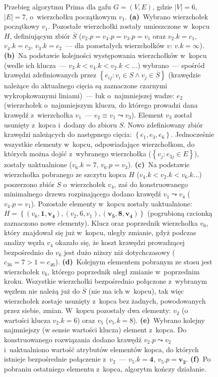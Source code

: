 \begin{figure}[!htbp]
\begin{subfigure}[b]{0.29\textwidth}
		\caption{}
		\label{fig:prime:f}
	\end{subfigure}
	\caption{
		Przebieg algorytmu Prima dla gafu $G = \left( V, E \right)$, gdzie $\left| V \right| = 6$, $\left| E \right| = 7$, o~wierzchołku początkowym $v_{1}$.
		\textbf{(a)}~Wybrano wierzchołek początkowy $v_{1}$.
		Pozostałe wierzchołki zostały umieszczone w~kopcu $H$, definiującym zbiór $\overline{S}$ ($v_{2}.p = v_{4}.p = v_{3}.p = v_{1}$ oraz $v_{2}.k = c_{1}$, $v_{4}.k = c_{3}$, $v_{3}.k = c_{2}$~--- dla pozostałych wierzchołków $v$: $v.k = \infty$).
		\textbf{(b)}~Na podstawie kolejności występowania wierzchołków w~kopcu (wedle ich klucza~--- $v_{3}.k < v_{4}.k < v_{2}.k < \dots$) wybrano~--- spośród krawędzi zdefiniowanych przez $\left\{ e_{ij} : v_{i} \in S \wedge v_{j} \in \overline{S} \right\}$ (krawędzie należące do aktualnego cięcia są zaznaczone czarnymi wykropkowanymi liniami)~--- łuk o~najmniejszej wadze: $e_{2}$ (wierzchołek o~najmniejszym kluczu, do którego prowadzi dana krawędź z~wierzchołka $v_{1}$~--- $e_{2} \equiv v_{1} \leadsto v_{3}$).
		Element $v_{3}$ został usunięty z~kopca i~dodany do zbioru $S$.
		Nowo zdefiniowany zbiór krawędzi należących do następnego cięcia: $\left\{ e_{1}, e_{3}, e_{6} \right\}$.
		Jednocześnie wszystkie elementy w~kopcu, odpowiadające wierzchołkom, do których można dojść z~wybranego wierzchołka ($\left\{ v_{j} : e_{3j} \in E \right\}$), zostały uaktualnione ($v_{6}.k = 7$, $v_{6}.p = v_{3}$).
		\textbf{(c)}~Na podstawie wierzchołka pobranego ze szczytu kopca $H$ ($v_{4}.k < v_{2}.k < v_{6}.k \dots$) poszerzono zbiór $S$ o~wierzchołek $v_{4}$, zaś do konstruowanego minimalnego drzewa rozpinającego dodano krawędź $v_{1} \leadsto v_{4}$ ($v_{4}.p = v_{1}$).
		Pozostałe elementy w~kopcu zostały uaktualnione: $H = \left\{ \left( v_{6}, \textbf{1}, \textbf{v}_{\textbf{4}} \right), \left( v_{2}, 6, v_{1} \right), \left( \textbf{v}_{\textbf{5}}, \textbf{8}, \textbf{v}_{\textbf{4}} \right) \right\}$ (pogrubioną czcionką zaznaczono nowe elementy).
		Klucz oraz poprzednik wierzchołka $v_{6}$, który znajdował się już w~kopcu, uległy zmianie, gdyż podczas analizy węzła $v_{4}$ okazało się, że koszt krawędzi prowadzącej bezpośrednio do $v_{6}$ jest dużo niższy niż dotychczasowy ($c_{36} = 7 > 1 = c_{46}$).
		\textbf{(d)}~Kolejnym elementem pobranym ze stosu jest wierzchołek $v_{6}$, którego poprzednik uległ zmianie w~poprzednim kroku.
		Wszystkie wierzchołki bezpośrednio połączone z~wybranym węzłem nie należą już do $\overline{S}$ (nie ma ich w~kopcu), tak więc wierzchołek zostaje usunięty z~kopca bez żadnych, powodowanych przez siebie, zmian.
		W~kopcu pozostały dwa elementy: $v_{2}$ (o wartości klucza $v_{2}.k = 6$) oraz $v_{5}$ ($v_{5}.k = 8$).
		\textbf{(e)}~Wybrano kolejny najmniejszy (w sensie wartości klucza) element z~kopca.
		Do konstruowanego rozwiązania dodano krawędź $v_{2}.p \leadsto v_{2}$ i~uaktualniono wartość atrybutów elementów kopca, do których istnieje bezpośrednie połączenie z~$v_{2}$~--- $v_{5}.k = \textbf{4}$, $v_{5}.p = \textbf{v}_{\textbf{2}}$.
		\textbf{(f)}~Po pobraniu ostatniego elementu z~kopca, algorytm kończy działanie.
	}
	\label{fig:prime}
\end{figure}

